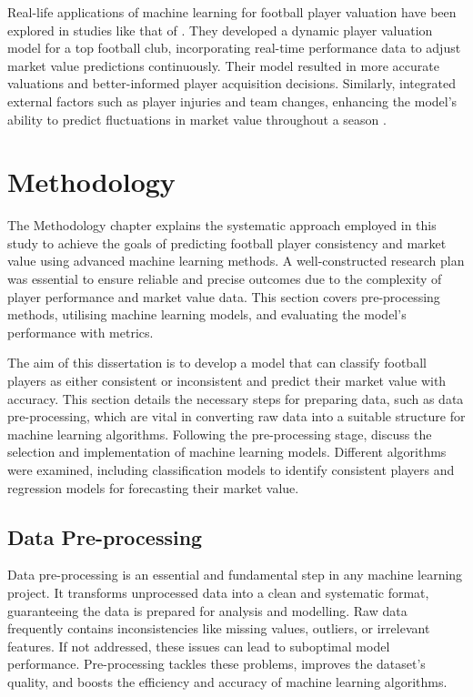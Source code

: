 \documentclass[12pt, a4paper,oneside]{book}
\numberwithin{equation}{section}
\begin{document}
Real-life applications of machine learning for football player valuation have been explored in studies like that of \cite{kumar2021}. They developed a dynamic player valuation model for a top football club, incorporating real-time performance data to adjust market value predictions continuously. Their model resulted in more accurate valuations and better-informed player acquisition decisions. Similarly, \cite{brown2020} integrated external factors such as player injuries and team changes, enhancing the model's ability to predict fluctuations in market value throughout a season .

\chapter{Methodology}\label{ch:3}

The Methodology chapter explains the systematic approach employed in this study to achieve the goals of predicting football player consistency and market value using advanced machine learning methods. A well-constructed research plan was essential to ensure reliable and precise outcomes due to the complexity of player performance and market value data. This section covers pre-processing methods, utilising machine learning models, and evaluating the model's performance with metrics.

The aim of this dissertation is to develop a model that can classify football players as either consistent or inconsistent and predict their market value with accuracy. This section details the necessary steps for preparing data, such as data pre-processing, which are vital in converting raw data into a suitable structure for machine learning algorithms. Following the pre-processing stage, discuss the selection and implementation of machine learning models. Different algorithms were examined, including classification models to identify consistent players and regression models for forecasting their market value.


\section{Data Pre-processing}\label{sec:3.1}

Data pre-processing is an essential and fundamental step in any machine learning project. It transforms unprocessed data into a clean and systematic format, guaranteeing the data is prepared for analysis and modelling. Raw data frequently contains inconsistencies like missing values, outliers, or irrelevant features. If not addressed, these issues can lead to suboptimal model performance. Pre-processing tackles these problems, improves the dataset's quality, and boosts the efficiency and accuracy of machine learning algorithms.
\end{document}
